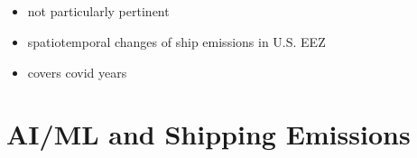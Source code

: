 \documentclass{article}
\newcommand{\paperpath}{../resources/}
\newcommand{\myhref}[2]{\href{run:\paperpath#1}{#2}}
\begin{document}
\subsection{\myhref{Mou et al 2023 - Carbon footprints: Uncovering multilevel spatiotemporal changes of ship.pdf}{\textcite{mou2024carbon}}}
\begin{itemize}
    \item not particularly pertinent
    \item spatiotemporal changes of ship emissions in U.S. EEZ
    \item covers covid years
\end{itemize}



\section{AI/ML and Shipping Emissions}
\end{document}
